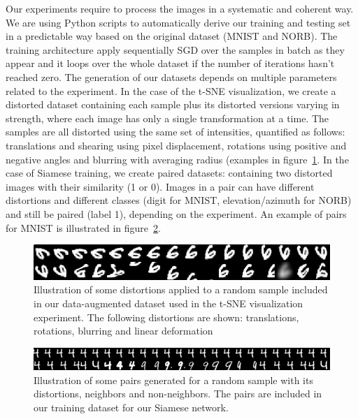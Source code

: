 \documentclass[a4paper,12pt]{report}
\begin{document}
Our experiments require to process the images in a systematic and coherent way.
We are using Python scripts to automatically derive our training and testing set in a predictable way based on the original dataset (MNIST and NORB).
The training architecture apply sequentially SGD over the samples in batch as they appear and it loops over the whole dataset if the number of iterations hasn't reached zero.
The generation of our datasets depends on multiple parameters related to the experiment.
In the case of the t-SNE visualization, we create a distorted dataset containing each sample plus its distorted versions varying in strength, where each image has only a single transformation at a time.
The samples are all distorted using the same set of intensities, quantified as follows: translations and shearing using pixel displacement, rotations using positive and negative angles and blurring with averaging radius (examples in figure~\ref{fig:mnist_transfo_tsne}.
In the case of Siamese training, we create paired datasets: containing two distorted images with their similarity (1 or 0).
Images in a pair can have different distortions and different classes (digit for MNIST, elevation/azimuth for NORB) and still be paired (label 1), depending on the experiment.
An example of pairs for MNIST is illustrated in figure~\ref{fig:mnist_pairs}.

\begin{figure}[t]
    \begin{center}
        \includegraphics{thesis_figures/mnist_transfo_tsne.jpg}
    \end{center}
    \caption{Illustration of some distortions applied to a random sample included in our data-augmented dataset used in the t-SNE visualization experiment. The following distortions are shown: translations, rotations, blurring and linear deformation}
    \label{fig:mnist_transfo_tsne}
\end{figure}

\begin{figure}[t]
    \begin{center}
        \includegraphics{thesis_figures/mnist_pairs.jpg}
    \end{center}
    \caption{Illustration of some pairs generated for a random sample with its distortions, neighbors and non-neighbors. The pairs are included in our training dataset for our Siamese network.}
    \label{fig:mnist_pairs}
\end{figure}
\end{document}
